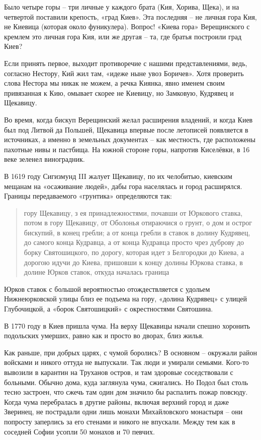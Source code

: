 Было четыре горы – три личные у каждого брата (Кия, Хорива, Щека), и на четвертой поставили крепость, «град Киев». Эта последняя – не личная гора Кия, не Киевица (которая около фуникулера). Вопрос! «Киева гора» Верещинского с кремлем это личная гора Кия, или же другая – та, где братья построили град Киев? 

Если принять первое, выходит противоречие с нашими представлениями, ведь, согласно Нестору, Кий жил там, «идеже ныне увоз Боричев». Хотя проверить слова Нестора мы никак не можем, а речка Киянка, явно именем своим привязанная к Кию, омывает скорее не Киевицу, но Замковую, Кудрявец и Щекавицу.

Во время, когда бискуп Верещинский желал расширения владений, и когда Киев был под Литвой да Польшей, Щекавица впервые после летописей появляется в источниках, а именно в земельных документах – как местность, где расположены пахотные нивы и пастбища. На южной стороне горы, напротив Киселёвки, в 16 веке зеленел виноградник.

В 1619 году Сигизмунд III жалует Щекавицу, по их челобитью, киевским мещанам на «осаживание людей», дабы гора населялась и город расширялся. Границы передаваемого «грунтика» определяются так:

\begin{quotation}
гору Щекавицу, з ея принадлежностями, почавши от Юркового ставка, потом в гору Щекавицу, от Оболонья отираючися о грунт, о дом и острог бискупий, в конец гребли; а от конца гребли в ставок в долину Кудрявец, до самого конца Кудравца, а от конца Кудравца просто чрез дуброву до борку Святошицкого, по дорогу, которая идет з Белгородки до Киева, а дорогою идучи до Киева, пришовши к концу долины Юркова ставка, в долине Юрков ставок, откуда началась граница
\end{quotation}

Юрков ставок с большой вероятностью отождествляется с удольем Нижнеюрковской улицы близ ее подъема на гору, «долина Кудрявец» с улицей Глубочицкой, а «борок Святошицкий» с окрестностями Святошина.

В 1770 году в Киев пришла чума. На верху Щекавицы начали спешно хоронить подольских умерших, равно как и просто во дворах, близ жилья.

Как раньше, при добрых царях, с чумой боролись? В основном – окружали район войсками и никого оттуда не выпускали. Так люди и умирали семьями. Кого-то вывозили в карантин на Труханов остров, и там здоровые соседствовали с больными. Обычно дома, куда заглянула чума, сжигались. Но Подол был столь тесно застроен, что сжечь там один дом значило бы распалить пожар повсюду. Когда чума перебралась в другие районы, включая верхний город и даже Зверинец, не пострадали одни лишь монахи Михайловского монастыря – они попросту заперлись за его стенами и никого не впускали. Между тем как в соседней Софии усопли 50 монахов и 70 певчих.

